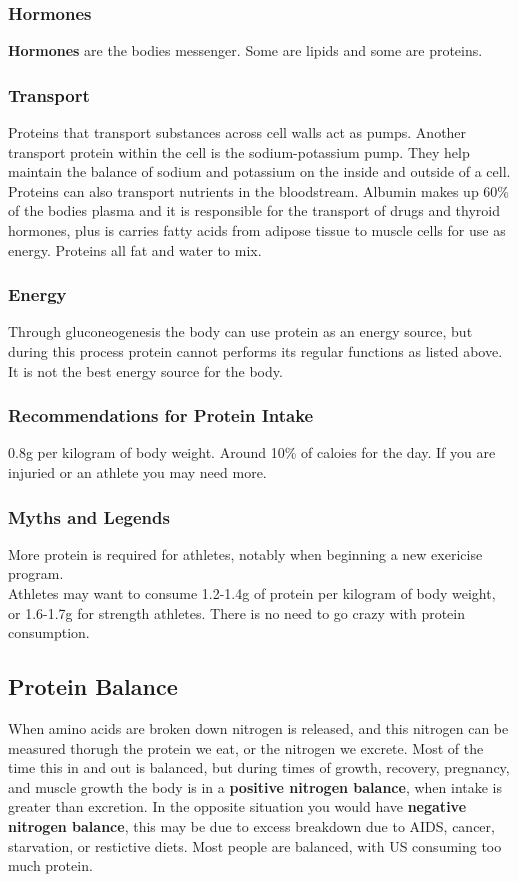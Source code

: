 \documentclass[letterpaper, 11pt]{article}
\begin{document}
\subsubsection{Hormones}
\label{sec:org6dccec2}
\textbf{Hormones} are the bodies messenger. Some are lipids and some are proteins.\\
\subsubsection{Transport}
\label{sec:org90f4a2f}
Proteins that transport substances across cell walls act as pumps. Another transport protein within the cell is the sodium-potassium pump. They help maintain the balance of sodium and potassium on the inside and outside of a cell. Proteins can also transport nutrients in the bloodstream. Albumin makes up 60\% of the bodies plasma and it is responsible for the transport of drugs and thyroid hormones, plus is carries fatty acids from adipose tissue to muscle cells for use as energy. Proteins all fat and water to mix.\\
\subsubsection{Energy}
\label{sec:org36f77d3}
Through gluconeogenesis the body can use protein as an energy source, but during this process protein cannot performs its regular functions as listed above. It is not the best energy source for the body.\\
\subsubsection{Recommendations for Protein Intake}
\label{sec:orgde8d6f0}
0.8g per kilogram of body weight. Around 10\% of caloies for the day. If you are injuried or an athlete you may need more.\\
\subsubsection{Myths and Legends}
\label{sec:org5d6b3c2}
More protein is required for athletes, notably when beginning a new exericise program.\\
Athletes may want to consume 1.2-1.4g of protein per kilogram of body weight, or 1.6-1.7g for strength athletes. There is no need to go crazy with protein consumption.\\
\subsection{Protein Balance}
\label{sec:orga49fb27}
When amino acids are broken down nitrogen is released, and this nitrogen can be measured thorugh the protein we eat, or the nitrogen we excrete. Most of the time this in and out is balanced, but during times of growth, recovery, pregnancy, and muscle growth the body is in a \textbf{positive nitrogen balance}, when intake is greater than excretion. In the opposite situation you would have \textbf{negative nitrogen balance}, this may be due to excess breakdown due to AIDS, cancer, starvation, or restictive diets. Most people are balanced, with US consuming too much protein.\\
\end{document}
